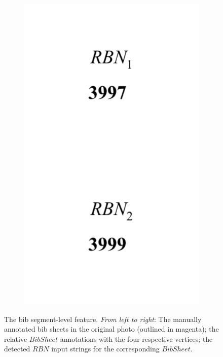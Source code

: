 \begin{figure}[p]
\begin{subfigure}[b]{0.25\textwidth}
    \includegraphics[width=\textwidth]{images/dataset/BibSheet_RBN}
  \end{subfigure} 
  \hspace{\fill}
  \caption[Bib Sheet segment-level features]{The bib segment-level feature. \textit{From left to right}: The manually annotated bib sheets in the original photo (outlined in magenta); the relative $BibSheet$ annotations with the four respective vertices; the detected $RBN$ input strings for the corresponding $BibSheet$.}
  \label{fig:dataset:bib_sheet_features}
\end{figure}

